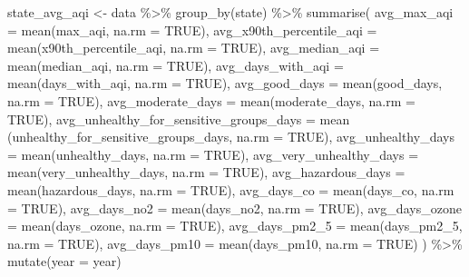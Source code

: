 \documentclass[
  12pt,
]{article}
\newenvironment{Shaded}{\begin{snugshade}}{\end{snugshade}}
\newcommand{\AttributeTok}[1]{\textcolor[rgb]{0.40,0.45,0.13}{#1}}
\newcommand{\ConstantTok}[1]{\textcolor[rgb]{0.56,0.35,0.01}{#1}}
\newcommand{\FunctionTok}[1]{\textcolor[rgb]{0.28,0.35,0.67}{#1}}
\newcommand{\NormalTok}[1]{\textcolor[rgb]{0.00,0.23,0.31}{#1}}
\newcommand{\OtherTok}[1]{\textcolor[rgb]{0.00,0.23,0.31}{#1}}
\newcommand{\SpecialCharTok}[1]{\textcolor[rgb]{0.37,0.37,0.37}{#1}}
\begin{document}
\begin{Shaded}
\begin{Highlighting}[]
\NormalTok{  state\_avg\_aqi }\OtherTok{\textless{}{-}}\NormalTok{ data }\SpecialCharTok{\%\textgreater{}\%}
    \FunctionTok{group\_by}\NormalTok{(state) }\SpecialCharTok{\%\textgreater{}\%}
    \FunctionTok{summarise}\NormalTok{(}
      \AttributeTok{avg\_max\_aqi =} \FunctionTok{mean}\NormalTok{(max\_aqi, }
                         \AttributeTok{na.rm =} \ConstantTok{TRUE}\NormalTok{),}
      \AttributeTok{avg\_x90th\_percentile\_aqi =} \FunctionTok{mean}\NormalTok{(x90th\_percentile\_aqi, }
                                      \AttributeTok{na.rm =} \ConstantTok{TRUE}\NormalTok{),}
      \AttributeTok{avg\_median\_aqi =} \FunctionTok{mean}\NormalTok{(median\_aqi, }
                            \AttributeTok{na.rm =} \ConstantTok{TRUE}\NormalTok{),}
      \AttributeTok{avg\_days\_with\_aqi =} \FunctionTok{mean}\NormalTok{(days\_with\_aqi, }
                               \AttributeTok{na.rm =} \ConstantTok{TRUE}\NormalTok{),}
      \AttributeTok{avg\_good\_days =} \FunctionTok{mean}\NormalTok{(good\_days, }
                           \AttributeTok{na.rm =} \ConstantTok{TRUE}\NormalTok{),}
      \AttributeTok{avg\_moderate\_days =} \FunctionTok{mean}\NormalTok{(moderate\_days, }
                               \AttributeTok{na.rm =} \ConstantTok{TRUE}\NormalTok{),}
      \AttributeTok{avg\_unhealthy\_for\_sensitive\_groups\_days =}\NormalTok{ mean}
\NormalTok{      (unhealthy\_for\_sensitive\_groups\_days, }\AttributeTok{na.rm =} \ConstantTok{TRUE}\NormalTok{),}
      \AttributeTok{avg\_unhealthy\_days =} \FunctionTok{mean}\NormalTok{(unhealthy\_days, }
                                \AttributeTok{na.rm =} \ConstantTok{TRUE}\NormalTok{),}
      \AttributeTok{avg\_very\_unhealthy\_days =} \FunctionTok{mean}\NormalTok{(very\_unhealthy\_days, }
                                     \AttributeTok{na.rm =} \ConstantTok{TRUE}\NormalTok{),}
      \AttributeTok{avg\_hazardous\_days =} \FunctionTok{mean}\NormalTok{(hazardous\_days, }
                                \AttributeTok{na.rm =} \ConstantTok{TRUE}\NormalTok{),}
      \AttributeTok{avg\_days\_co =} \FunctionTok{mean}\NormalTok{(days\_co, }
                         \AttributeTok{na.rm =} \ConstantTok{TRUE}\NormalTok{),}
      \AttributeTok{avg\_days\_no2 =} \FunctionTok{mean}\NormalTok{(days\_no2, }
                          \AttributeTok{na.rm =} \ConstantTok{TRUE}\NormalTok{),}
      \AttributeTok{avg\_days\_ozone =} \FunctionTok{mean}\NormalTok{(days\_ozone, }
                            \AttributeTok{na.rm =} \ConstantTok{TRUE}\NormalTok{),}
      \AttributeTok{avg\_days\_pm2\_5 =} \FunctionTok{mean}\NormalTok{(days\_pm2\_5, }
                            \AttributeTok{na.rm =} \ConstantTok{TRUE}\NormalTok{),}
      \AttributeTok{avg\_days\_pm10 =} \FunctionTok{mean}\NormalTok{(days\_pm10, }
                           \AttributeTok{na.rm =} \ConstantTok{TRUE}\NormalTok{)}
\NormalTok{    ) }\SpecialCharTok{\%\textgreater{}\%}
    \FunctionTok{mutate}\NormalTok{(}\AttributeTok{year =}\NormalTok{ year)  }
  

\end{Highlighting}
\end{Shaded}
\end{document}
